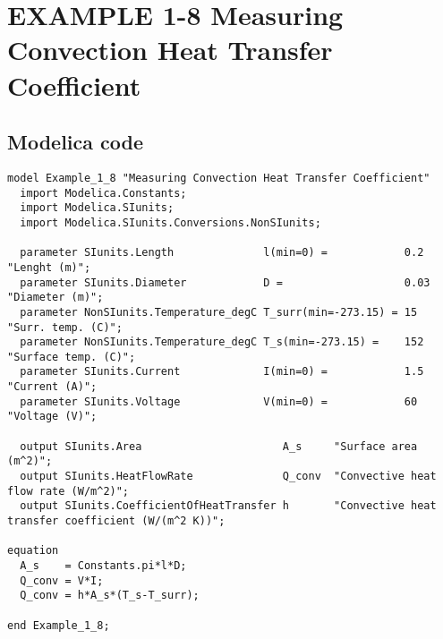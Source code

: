 \documentclass{modelica}
\begin{document}
\thispagestyle{empty}
\date{} %

\section*{EXAMPLE 1-8 Measuring Convection Heat Transfer Coefficient}

\subsection*{Modelica code}


\begin{lstlisting}[mathescape=true] 
model Example_1_8 "Measuring Convection Heat Transfer Coefficient"
  import Modelica.Constants;
  import Modelica.SIunits;
  import Modelica.SIunits.Conversions.NonSIunits;

  parameter SIunits.Length              l(min=0) =            0.2  "Lenght (m)";
  parameter SIunits.Diameter            D =                   0.03 "Diameter (m)";
  parameter NonSIunits.Temperature_degC T_surr(min=-273.15) = 15   "Surr. temp. (C)";
  parameter NonSIunits.Temperature_degC T_s(min=-273.15) =    152  "Surface temp. (C)";
  parameter SIunits.Current             I(min=0) =            1.5  "Current (A)";
  parameter SIunits.Voltage             V(min=0) =            60   "Voltage (V)";

  output SIunits.Area                      A_s     "Surface area (m^2)";
  output SIunits.HeatFlowRate              Q_conv  "Convective heat flow rate (W/m^2)";
  output SIunits.CoefficientOfHeatTransfer h       "Convective heat transfer coefficient (W/(m^2 K))";

equation 
  A_s    = Constants.pi*l*D;
  Q_conv = V*I;
  Q_conv = h*A_s*(T_s-T_surr);
  
end Example_1_8;  
\end{lstlisting}
\end{document}
